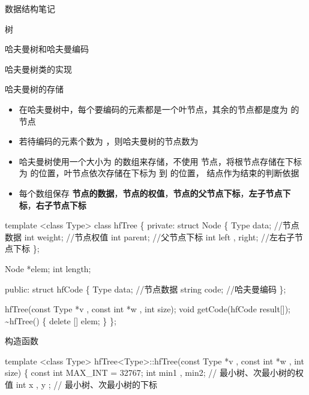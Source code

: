 \documentclass[
  ignorenonframetext,
]{beamer}
\newenvironment{Shaded}{}{}
\newcommand{\NormalTok}[1]{#1}
\providecommand{\tightlist}{%
  \setlength{\itemsep}{0pt}\setlength{\parskip}{0pt}}
\begin{document}
\begin{frame}[fragile]{数据结构笔记}
\begin{block}{树}
\begin{block}{哈夫曼树和哈夫曼编码}
\begin{block}{哈夫曼树类的实现}
\begin{block}{哈夫曼树的存储}
\protect{}\label{ux54c8ux592bux66fcux6811ux7684ux5b58ux50a8}
\begin{itemize}
\tightlist
\item
  在哈夫曼树中，每个要编码的元素都是一个叶节点，其余的节点都是度为 {}
  的节点
\item
  若待编码的元素个数为 {}，则哈夫曼树的节点数为 {}
\item
  哈夫曼树使用一个大小为 {} 的数组来存储，不使用 {}
  节点，将根节点存储在下标为 {} 的位置，叶节点依次存储在下标为 {} 到 {}
  的位置，{} 结点作为结束的判断依据
\item
  每个数组保存
  \textbf{节点的数据}，\textbf{节点的权值}，\textbf{节点的父节点下标}，\textbf{左子节点下标}，\textbf{右子节点下标}
\end{itemize}

\begin{Shaded}
\begin{Highlighting}[]
\NormalTok{template \textless{}class Type\textgreater{}}
\NormalTok{class hfTree}
\NormalTok{\{}
\NormalTok{  private:}
\NormalTok{    struct Node}
\NormalTok{    \{}
\NormalTok{      Type data; //节点数据}
\NormalTok{      int weight; //节点权值}
\NormalTok{      int parent; //父节点下标}
\NormalTok{      int left , right; //左右子节点下标}
\NormalTok{    \};}

\NormalTok{    Node *elem;}
\NormalTok{    int length;}
  
\NormalTok{  public:}
\NormalTok{    struct hfCode}
\NormalTok{    \{}
\NormalTok{      Type data; //节点数据}
\NormalTok{      string code; //哈夫曼编码}
\NormalTok{    \};}

\NormalTok{    hfTree(const Type *v , const int *w , int size);}
\NormalTok{    void getCode(hfCode result[]);}
\NormalTok{    \textasciitilde{}hfTree()}
\NormalTok{    \{}
\NormalTok{      delete [] elem;}
\NormalTok{    \}}
\NormalTok{\};}
\end{Highlighting}
\end{Shaded}
\end{block}

\begin{block}{构造函数}
\protect{}\label{ux6784ux9020ux51fdux6570-8}
\begin{Shaded}
\begin{Highlighting}[]
\NormalTok{template \textless{}class Type\textgreater{}}
\NormalTok{hfTree\textless{}Type\textgreater{}::hfTree(const Type *v , const int *w , int size)}
\NormalTok{\{}
\NormalTok{  const int MAX\_INT = 32767;}
\NormalTok{  int min1 , min2; // 最小树、次最小树的权值}
\NormalTok{  int x , y ; // 最小树、次最小树的下标}


\end{Highlighting}
\end{Shaded}
\end{block}
\end{block}
\end{block}
\end{block}
\end{frame}
\end{document}
